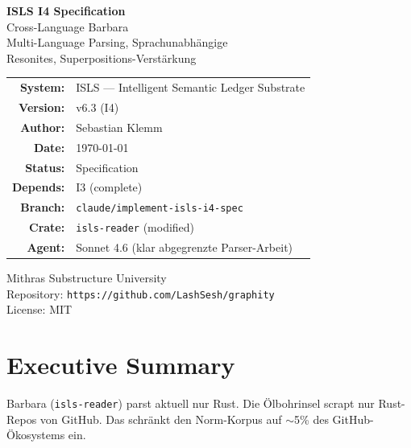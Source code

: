 \documentclass[11pt,a4paper]{article}
\begin{document}
\begin{titlepage}
\centering
\vspace*{2.5cm}

{\Huge\bfseries\color{isls-blue} ISLS I4 Specification}\\[0.5cm]
{\LARGE\color{isls-orange} Cross-Language Barbara}\\[0.3cm]
{\large\color{isls-gray} Multi-Language Parsing, Sprachunabh\"angige\\
Resonites, Superpositions-Verst\"arkung}\\[2cm]

{\large
\begin{tabular}{rl}
\textbf{System:}       & ISLS --- Intelligent Semantic Ledger Substrate \\
\textbf{Version:}      & v6.3 (I4) \\
\textbf{Author:}       & Sebastian Klemm \\
\textbf{Date:}         & \today \\
\textbf{Status:}       & Specification \\
\textbf{Depends:}      & I3 (complete) \\
\textbf{Branch:}       & \texttt{claude/implement-isls-i4-spec} \\
\textbf{Crate:}        & \texttt{isls-reader} (modified) \\
\textbf{Agent:}        & Sonnet 4.6 (klar abgegrenzte Parser-Arbeit) \\
\end{tabular}
}

\vfill

{\small\color{isls-gray}
Mithras Substructure University\\
Repository: \texttt{https://github.com/LashSesh/graphity}\\
License: MIT
}
\end{titlepage}

\tableofcontents
\newpage


\section{Executive Summary}

Barbara (\texttt{isls-reader}) parst aktuell nur Rust. Die 
\"Olbohrinsel scrapt nur Rust-Repos von GitHub. Das schr\"ankt 
den Norm-Korpus auf $\sim$5\% des GitHub-\"Okosystems ein.
\end{document}

